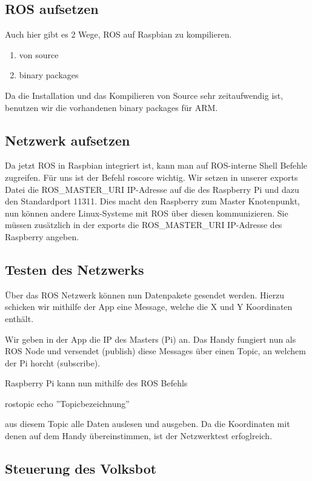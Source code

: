 \documentclass[12pt]{article}
\begin{document}
\subsection{ROS aufsetzen}

Auch hier gibt es 2 Wege, ROS auf Raspbian zu kompilieren.
\begin{enumerate}
\item von source
\item binary packages
\end{enumerate}

Da die Installation und das Kompilieren von Source sehr zeitaufwendig ist, benutzen wir die vorhandenen binary packages für ARM.

\subsection{Netzwerk aufsetzen}
Da jetzt ROS in Raspbian integriert ist, kann man auf ROS-interne Shell Befehle zugreifen.
Für uns ist der Befehl roscore wichtig.
Wir setzen in unserer exports Datei die ROS_MASTER_URI IP-Adresse auf die des Raspberry Pi und dazu den Standardport 11311.
Dies macht den Raspberry zum Master Knotenpunkt, nun können andere Linux-Systeme mit ROS über diesen kommunizieren.
Sie müssen zusätzlich in der exports die ROS_MASTER_URI IP-Adresse des Raspberry angeben.

\subsection{Testen des Netzwerks}

Über das ROS Netzwerk können nun Datenpakete gesendet werden.
Hierzu schicken wir mithilfe der App eine Message, welche die X und Y Koordinaten enthält.

Wir geben in der App die IP des Masters (Pi) an. Das Handy fungiert nun als ROS Node und versendet (publish) diese Messages über einen Topic, an welchem der Pi horcht (subscribe).

Raspberry Pi kann nun mithilfe des ROS Befehls

	rostopic echo ''Topicbezeichnung''
	
aus diesem Topic alle Daten auslesen und ausgeben.
Da die Koordinaten mit denen auf dem Handy übereinstimmen, ist der Netzwerktest erfoglreich.

\subsection{Steuerung des Volksbot}
\end{document}
